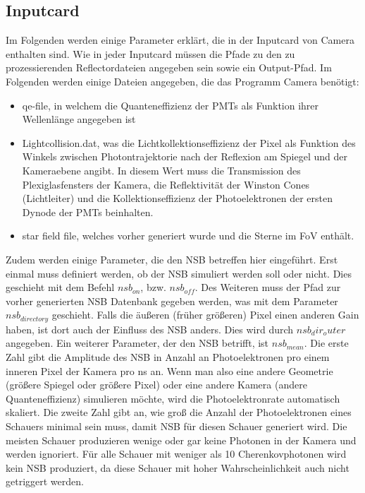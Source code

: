 \subsection{Inputcard}
Im Folgenden werden einige Parameter erklärt, die in der Inputcard von Camera enthalten sind.
Wie in jeder Inputcard müssen die Pfade zu den zu prozessierenden Reflectordateien angegeben sein sowie ein Output-Pfad.
Im Folgenden werden einige Dateien angegeben, die das Programm Camera benötigt:

\begin{itemize}
 \item qe-file, in welchem die Quanteneffizienz der PMTs als Funktion ihrer Wellenlänge angegeben ist
 \item Lightcollision.dat, was die Lichtkollektionseffizienz der Pixel als Funktion des Winkels zwischen Photontrajektorie nach der Reflexion am Spiegel und der Kameraebene angibt.
 In diesem Wert muss die Transmission des Plexiglasfensters der Kamera, die Reflektivität der Winston Cones (Lichtleiter) und die Kollektionseffizienz der Photoelektronen der ersten Dynode der PMTs beinhalten.
 \item star field file, welches vorher generiert wurde und die Sterne im FoV enthält.
\end{itemize}

Zudem werden einige Parameter, die den NSB betreffen hier eingeführt.
Erst einmal muss definiert werden, ob der NSB simuliert werden soll oder nicht. 
Dies geschieht mit dem Befehl $nsb_{on}$, bzw. $nsb_{off}$.
Des Weiteren muss der Pfad zur vorher generierten NSB Datenbank gegeben werden, was mit dem Parameter $nsb_{directory}$ geschieht.
Falls die äußeren (früher größeren) Pixel einen anderen Gain haben, ist dort auch der Einfluss des NSB anders. 
Dies wird durch $nsb_dir_outer$ angegeben.
Ein weiterer Parameter, der den NSB betrifft, ist $nsb_{mean}$.
Die erste Zahl gibt die Amplitude des NSB in Anzahl an Photoelektronen pro einem inneren Pixel der Kamera pro ns an.
Wenn man also eine andere Geometrie (größere Spiegel oder größere Pixel) oder eine andere Kamera (andere Quanteneffizienz) simulieren möchte, wird die Photoelektronrate automatisch skaliert.
Die zweite Zahl gibt an, wie groß die Anzahl der Photoelektronen eines Schauers minimal sein muss, damit NSB für diesen Schauer generiert wird.
Die meisten Schauer produzieren wenige oder gar keine Photonen in der Kamera und werden ignoriert.
Für alle Schauer mit weniger als 10 Cherenkovphotonen wird kein NSB produziert, da diese Schauer mit hoher Wahrscheinlichkeit auch nicht getriggert werden.


